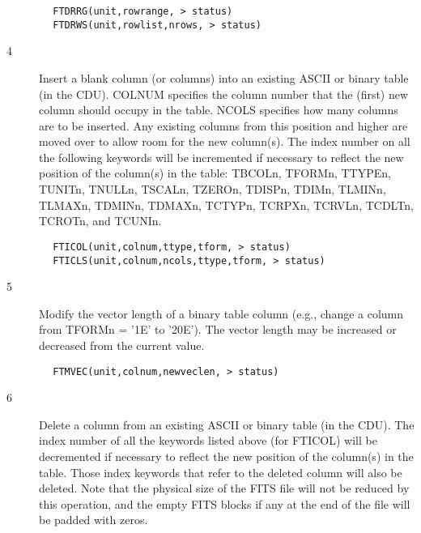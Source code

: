 \documentclass[11pt]{book}
\begin{document}
\begin{verbatim}
        FTDRRG(unit,rowrange, > status)
        FTDRWS(unit,rowlist,nrows, > status)
\end{verbatim}

\begin{description}
\item[4 ] Insert a blank column (or columns) into an existing ASCII or binary
    table (in the CDU).  COLNUM specifies the column number that the (first)
    new column should occupy in the table.  NCOLS specifies how many
    columns are to be inserted. Any existing columns from this position and
    higher are moved over to allow room for the new column(s).
    The index number on all the following keywords will be incremented
    if necessary to reflect the new position of the column(s) in the table:
    TBCOLn, TFORMn, TTYPEn, TUNITn, TNULLn, TSCALn, TZEROn, TDISPn, TDIMn,
    TLMINn, TLMAXn, TDMINn, TDMAXn, TCTYPn, TCRPXn, TCRVLn, TCDLTn, TCROTn,
   and TCUNIn.
\end{description}

\begin{verbatim}
        FTICOL(unit,colnum,ttype,tform, > status)
        FTICLS(unit,colnum,ncols,ttype,tform, > status)
\end{verbatim}

\begin{description}
\item[5 ] Modify the vector length of a binary table column (e.g.,
    change a column from TFORMn = '1E' to '20E').  The vector
   length may be increased or decreased from the current value.
\end{description}

\begin{verbatim}
        FTMVEC(unit,colnum,newveclen, > status)
\end{verbatim}

\begin{description}
\item[6 ] Delete a column from an existing ASCII or binary table (in the CDU).
    The index number of all the keywords listed above (for FTICOL) will be
    decremented if necessary to reflect the new position of the column(s) in
    the table.  Those index keywords that refer to the deleted column will
    also be deleted.  Note that the physical size of the FITS file will
    not be reduced by this operation, and the empty FITS blocks if any
   at the end of the file will be padded with zeros.
\end{description}
\end{document}
